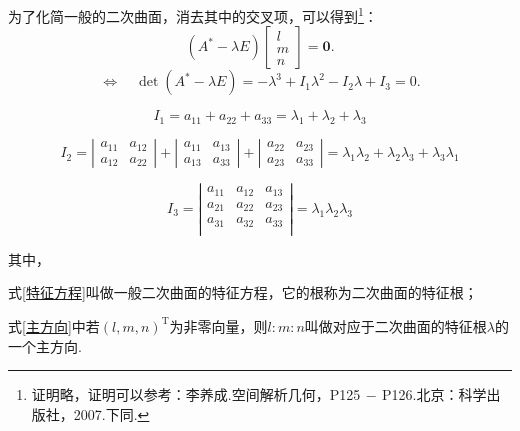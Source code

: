 \ttheorem[二次曲面的特征方程]
为了化简一般的二次曲面，消去其中的交叉项，可以得到\footnote[2]{证明略，证明可以参考：李养成.空间解析几何，P125$\,-\,$P126.北京：科学出版社，2007.下同.}：
\begin{equation}
\label{主方向}
\left( A^* - \lambda E \right)
\left[
\begin{array}{c}
l \\
m \\
n
\end{array}
\right] 
= \bm{0}.
\end{equation}
\begin{equation}
\label{特征方程}
\Longleftrightarrow
\quad
\det(A^* - \lambda E) = -\lambda^3 +I_1\lambda^2 - I_2\lambda + I_3 = 0.
\end{equation}

\begin{equation}
I_1=a_{11}+a_{22}+a_{33} = \lambda_1 +\lambda_2 +\lambda_3
\end{equation}

\begin{equation}
I_2=
\left| 
\begin{array}{cc}
a_{11} & a_{12} \\
a_{12} & a_{22} 
\end{array}
\right| 
+
\left| 
\begin{array}{cc}
a_{11} & a_{13} \\
a_{13} & a_{33} 
\end{array}
\right| 
+
\left| 
\begin{array}{cc}
a_{22} & a_{23} \\
a_{23} & a_{33}
\end{array}
\right| 
= \lambda_1\lambda_2 +\lambda_2\lambda_3 +\lambda_3\lambda_1
\end{equation}

\begin{equation}
I_3=
\left| 
\begin{array}{ccc}
a_{11} & a_{12} & a_{13}  \\
a_{21} & a_{22} & a_{23}  \\
a_{31} & a_{32} & a_{33}  \\
\end{array}
\right| 
= \lambda_1\lambda_2\lambda_3
\end{equation}
\par 其中，
\par \kg \kg \kg 式\eqref{特征方程}叫做一般二次曲面的{\color{dy}特征方程}，它的根称为二次曲面的{\color{dy}特征根}；
\par \kg \kg \kg  式\eqref{主方向}中若$(l,m,n)^{\text{T}}$为非零向量，则$l:m:n$叫做对应于二次曲面的特征根$\lambda$的一个{\color{dy}主方向}.

